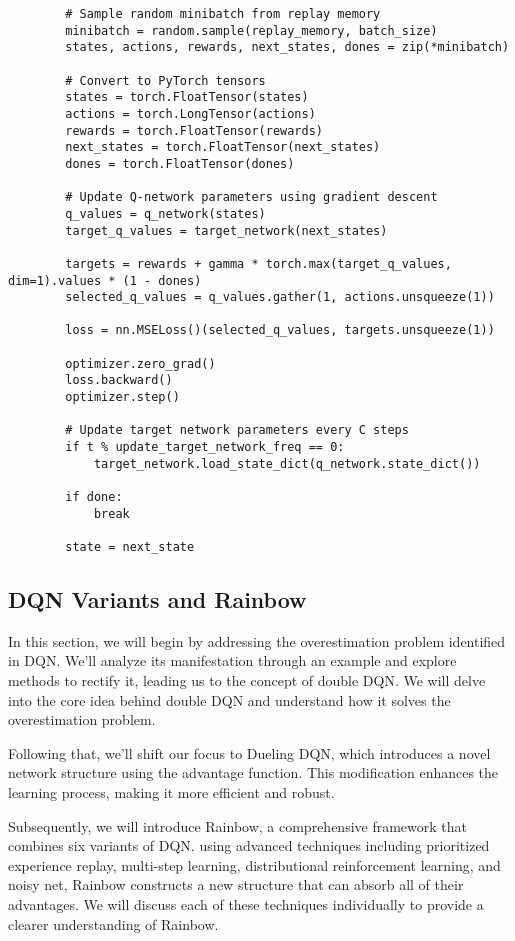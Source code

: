 \documentclass{article}
\begin{document}
\begin{lstlisting}
        # Sample random minibatch from replay memory
        minibatch = random.sample(replay_memory, batch_size)
        states, actions, rewards, next_states, dones = zip(*minibatch)

        # Convert to PyTorch tensors
        states = torch.FloatTensor(states)
        actions = torch.LongTensor(actions)
        rewards = torch.FloatTensor(rewards)
        next_states = torch.FloatTensor(next_states)
        dones = torch.FloatTensor(dones)

        # Update Q-network parameters using gradient descent
        q_values = q_network(states)
        target_q_values = target_network(next_states)

        targets = rewards + gamma * torch.max(target_q_values, dim=1).values * (1 - dones)
        selected_q_values = q_values.gather(1, actions.unsqueeze(1))

        loss = nn.MSELoss()(selected_q_values, targets.unsqueeze(1))

        optimizer.zero_grad()
        loss.backward()
        optimizer.step()

        # Update target network parameters every C steps
        if t % update_target_network_freq == 0:
            target_network.load_state_dict(q_network.state_dict())

        if done:
            break

        state = next_state

\end{lstlisting}


\newpage
\subsection{DQN Variants and Rainbow}

In this section, we will begin by addressing the overestimation problem identified in DQN. We'll analyze its manifestation through an example and explore methods to rectify it, leading us to the concept of double DQN. We will delve into the core idea behind double DQN and understand how it solves the overestimation problem.

Following that, we'll shift our focus to Dueling DQN, which introduces a novel network structure using the advantage function. This modification enhances the learning process, making it more efficient and robust.

Subsequently, we will introduce Rainbow, a comprehensive framework that combines six variants of DQN. using advanced techniques including prioritized experience replay, multi-step learning, distributional reinforcement learning, and noisy net, Rainbow constructs a new structure that can absorb all of their advantages. We will discuss each of these techniques individually to provide a clearer understanding of Rainbow.
\end{document}
